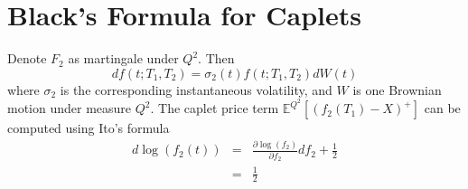 \chapter{Black's Formula for Caplets}

Denote $F_2$ as martingale under $Q^2$. Then
$$
df(t;T_1,T_2) = \sigma_2(t)f(t;T_1,T_2)dW(t)
$$
where $\sigma_2$ is the corresponding instantaneous volatility, and $W$ is one Brownian motion under measure $Q^2$. The caplet price term $\mathbb{E}^{Q^2}[(f_2(T_1)-X)^+]$ can be computed using Ito's formula
\begin{eqnarray*}
d\log(f_2(t)) &=& \frac{\partial \log(f_2)}{\partial f_2} df_2 + \frac{1}{2} \\
              &=& \frac{1}{2}
\end{eqnarray*}  